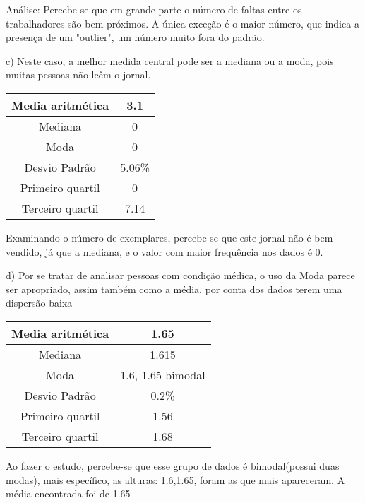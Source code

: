 \documentclass[12pt]{article}
\begin{document}
    Análise: Percebe-se que em grande parte o número de faltas entre os trabalhadores são bem próximos.
    A única exceção é o maior número, que indica a presença de um "outlier", um número muito fora do padrão.

    c) Neste caso, a melhor medida central pode ser a mediana ou a moda, pois muitas 
    pessoas não leêm o jornal. 

    \begin{center}
        \begin{tabular}{|c | c |} 
        \hline
        Media aritmética & 3.1 \\ 
        \hline
        Mediana & 0 \\ 
        \hline
        Moda & 0 \\ 
        \hline
        Desvio Padrão & 5.06\% \\ 
        \hline
        Primeiro quartil & 0 \\ 
        \hline
        Terceiro quartil & 7.14 \\ 
        \hline
       \end{tabular}
    \end{center}

    Examinando o número de exemplares, percebe-se que este jornal não é bem vendido, 
    já que a mediana, e o valor com maior frequência nos dados é 0.

    d) Por se tratar de analisar pessoas com condição médica, o uso da Moda parece ser
    apropriado, assim também como a média, por conta dos dados terem uma dispersão baixa

    \begin{center}
        \begin{tabular}{|c | c |} 
        \hline
        Media aritmética & 1.65 \\ 
        \hline
        Mediana & 1.615 \\ 
        \hline
        Moda & 1.6, 1.65 bimodal \\ 
        \hline
        Desvio Padrão & 0.2\% \\ 
        \hline
        Primeiro quartil & 1.56 \\ 
        \hline
        Terceiro quartil & 1.68 \\ 
        \hline
       \end{tabular}
    \end{center}

    Ao fazer o estudo, percebe-se que esse grupo de dados é bimodal(possui duas
    modas), mais específico, as alturas: 1.6,1.65, foram as que mais apareceram.
    A média encontrada foi de 1.65
\end{document}

